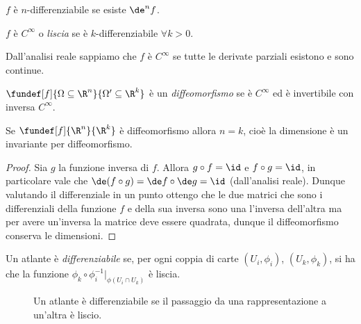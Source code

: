 \begin{defn}
	$f$ è $n$-differenziabile se esiste $\de^n f$.
\end{defn}

\begin{defn}
	$f$ è $C^{\infty}$ o \emph{liscia} se è $k$-differenziabile $\forall k > 0$.
\end{defn}

\begin{fat}
	Dall'analisi reale sappiamo che $f$ è $C^{\infty}$
	se tutte le derivate parziali esistono e sono continue.
\end{fat}

\begin{defn}[Diffeomorfismo]
	$\fundef[f]{\Omega \subseteq \R^n}{\Omega' \subseteq \R^k}$ è un \emph{diffeomorfismo}
	se è $C^\infty$ ed è invertibile con inversa $C^{\infty}$.
\end{defn}

\begin{prop}
	Se $\fundef[f]{\R^n}{\R^k}$ è diffeomorfismo allora $n = k$,
	cioè la dimensione è un invariante per diffeomorfismo.
\end{prop}

\begin{proof}
	Sia $g$ la funzione inversa di $f$.
	Allora $g \circ f = \id$ e $f \circ g = \id$,
	in particolare vale che $\de(f \circ g) = \de f \circ \de g = \id$ (dall'analisi reale).
	Dunque valutando il differenziale in un punto ottengo che le due matrici
	che sono i differenziali della funzione $f$ e della sua inversa
	sono una l'inversa dell'altra ma per avere un'inversa la matrice deve essere quadrata,
	dunque il diffeomorfismo conserva le dimensioni.
\end{proof}

\begin{defn}
	Un atlante è \emph{differenziabile} se,
	per ogni coppia di carte $(U_i,\phi_i)$, $(U_k,\phi_k)$, si ha che la funzione
	$\phi_k\circ\phi_i^{-1}|_{\phi(U_i\cap U_k)}$ è liscia.\footnotemark
	\begin{figure}
    \centering
    
    \caption{Un atlante è differenziabile se il passaggio da una rappresentazione a un'altra è liscio.}
	\end{figure}
\end{defn}

